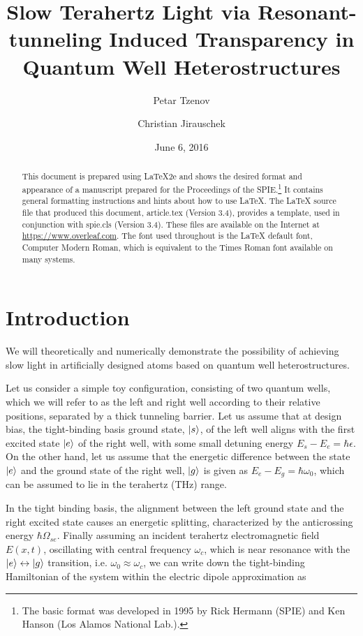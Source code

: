 \documentclass[]{spie}  %
\title{Slow Terahertz Light via Resonant-tunneling Induced Transparency in Quantum Well Heterostructures}
\author[a]{Petar Tzenov}%
\author[a]{Christian Jirauschek}%
\affil[a]{Institute for Nanoelectronics, Technical University of Munich, D-80333 Munich, Germany}
\date{June 6, 2016}%
\begin{document}
 
\maketitle

\begin{abstract}
This document is prepared using LaTeX2e\cite{Lamport94} and shows the desired format and appearance of a manuscript prepared for the Proceedings of the SPIE.\footnote{The basic format was developed in 1995 by Rick Hermann (SPIE) and Ken Hanson (Los Alamos National Lab.).} It contains general formatting instructions and hints about how to use LaTeX.  The LaTeX source file that produced this document, {\ttfamily article.tex} (Version 3.4), provides a template, used in conjunction with {\ttfamily spie.cls} (Version 3.4). These files are available on the Internet at \url{https://www.overleaf.com}.  The font used throughout is the LaTeX default font, Computer Modern Roman, which is equivalent to the Times Roman font available on many systems.  
\end{abstract}



 \section{Introduction}
 We will theoretically and numerically demonstrate the possibility of achieving slow light in artificially designed atoms based on quantum well heterostructures.
 
 Let us consider a simple toy configuration, consisting of two quantum wells, which we will refer to as the left and right well according to their relative positions, separated by a thick tunneling barrier. Let us assume that 
 at design bias, the tight-binding basis ground state, $\Ket{s}$, of the left well aligns with  the first excited state $\Ket{e}$ of the right well, with some small detuning energy $E_{s}-E_{e} = \hbar \epsilon$. On the other hand, let us assume that the energetic difference between the state $\Ket{e}$ and the ground state of the right well, $\Ket{g}$ is given as $E_{e}- E_{g} = \hbar\omega_0 $, which can be assumed to lie in the terahertz (THz) range. 
 
 In the tight binding basis, the alignment between the left ground state and the right excited state causes an energetic splitting, characterized by the anticrossing energy $\hbar\Omega_{se}$. Finally assuming an incident terahertz electromagnetic field $E(x,t)$, oscillating with central frequency $\omega_c$, which is near resonance with the $\Ket{e}\leftrightarrow\Ket{g}$ transition, i.e. $\omega_0 \approx \omega_c$, we can write down the tight-binding Hamiltonian of the system within the electric dipole approximation as
 
\end{document}
